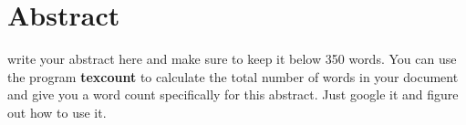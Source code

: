 \chapter*{Abstract}

write your abstract here and make sure to keep it below 350 words.  You can use
the program \textbf{texcount} to calculate the total number of words in your
document and give you a word count specifically for this abstract. Just google
it and figure out how to use it.
